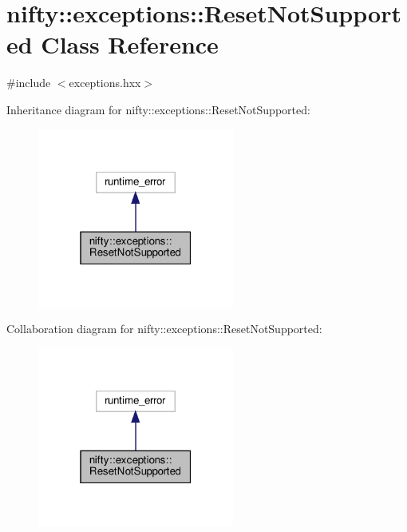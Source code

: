 \hypertarget{classnifty_1_1exceptions_1_1ResetNotSupported}{}\section{nifty\+:\+:exceptions\+:\+:Reset\+Not\+Supported Class Reference}
\label{classnifty_1_1exceptions_1_1ResetNotSupported}


{\ttfamily \#include $<$exceptions.\+hxx$>$}



Inheritance diagram for nifty\+:\+:exceptions\+:\+:Reset\+Not\+Supported\+:
\nopagebreak
\begin{figure}[H]
\begin{center}
\leavevmode
\includegraphics[width=183pt]{classnifty_1_1exceptions_1_1ResetNotSupported__inherit__graph}
\end{center}
\end{figure}


Collaboration diagram for nifty\+:\+:exceptions\+:\+:Reset\+Not\+Supported\+:
\nopagebreak
\begin{figure}[H]
\begin{center}
\leavevmode
\includegraphics[width=183pt]{classnifty_1_1exceptions_1_1ResetNotSupported__coll__graph}
\end{center}
\end{figure}
